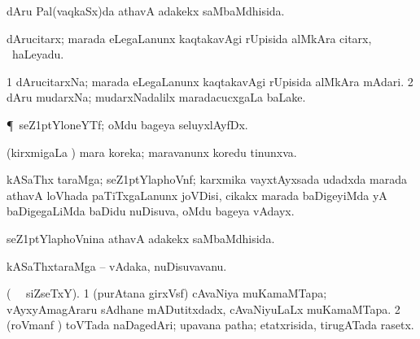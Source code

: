 \bentry
{} 
\gl{\gu} 
\bmng
dAru Pal(vaqkaSx)da athavA adakekx saMbaMdhisida.
\emng
\eentry

\bentry
{} 
\gl{\nA}
\bmng
dArucitarx; marada eLegaLanunx kaqtakavAgi rUpisida alMkAra citarx, \kanmu\ haLeyadu.
\emng
\eentry

\bentry
{} 
\gl{\nA} 
\bmng
\bnum
\num{1} dArucitarxNa; marada  eLegaLanunx kaqtakavAgi rUpisida alMkAra mAdari. 
\num{2} dAru mudarxNa; mudarxNadalilx maradacucxgaLa baLake.
\enum
\emng
\eentry

\bentry
{} 
\gl{\nA} 
\bmng
\P\ seZ\kern1ptYloneYTf; oMdu bageya seluyxlAyfDx.
\emng
\eentry

\bentry
{} 
\gl{\gu} 
\bmng
(kirxmigaLa \vi) mara  koreka; maravanunx koredu tinunxva.
\emng 
\eentry

\bentry
{}  
\gl{\nA}
\bmng
kASaThx taraMga; seZ\kern1ptYlaphoVnf; karxmika vayxtAyxsada udadxda  marada athavA loVhada paTiTxgaLanunx joVDisi, cikakx marada baDigeyiMda yA baDigegaLiMda baDidu   nuDisuva, oMdu bageya vAdayx. \quad {}
\emng
\eentry

\bentry
{}  
\gl{\gu} 
\bmng
seZ\kern1ptYlaphoVnina athavA adakekx  saMbaMdhisida.
\emng
\eentry

\bentry
{} 
\gl{\nA}
\bmng
kASaThxtaraMga -- vAdaka, nuDisuvavanu.
\emng 
\eentry

\bentry
{}
\gl{\nA}
\bmng
(\bava\   \ucAcx\ siZseTxY).
\bnum
\num{1} (purAtana girxVsf) cAvaNiya muKamaMTapa; vAyxyAmagAraru sAdhane mADutitxdadx, cAvaNiyuLaLx muKamaMTapa. 
\num{2} (roVmanf \pArxca) toVTada naDagedAri; upavana patha; etatxrisida, tirugATada rasetx.
\enum
\emng
\eentry

%

